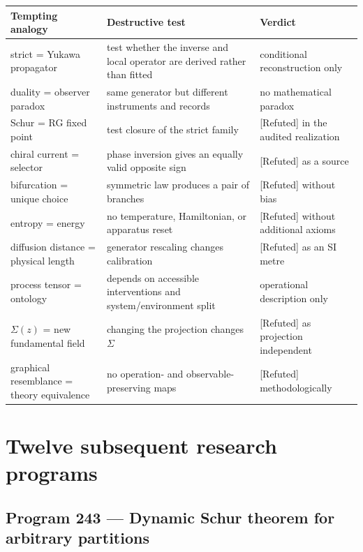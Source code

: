 \documentclass[11pt,a4paper,openany]{report}
\newcommand{\statusRefuted}{\textcolor{finred}{[Refuted]}}
\begin{document}
\begin{center}
\begingroup\small
\setlength{\tabcolsep}{2.5pt}
\renewcommand{\arraystretch}{1.16}
\begin{longtable}{@{}p{}p{}p{}@{}}
\toprule
\textbf{Tempting analogy} & \textbf{Destructive test} & \textbf{Verdict} \\
\midrule
\endhead
strict = Yukawa propagator & test whether the inverse and local operator are derived rather than fitted & conditional reconstruction only \\
duality = observer paradox & same generator but different instruments and records & no mathematical paradox \\
Schur = RG fixed point & test closure of the strict family & \statusRefuted{} in the audited realization \\
chiral current = selector & phase inversion gives an equally valid opposite sign & \statusRefuted{} as a source \\
bifurcation = unique choice & symmetric law produces a pair of branches & \statusRefuted{} without bias \\
entropy = energy & no temperature, Hamiltonian, or apparatus reset & \statusRefuted{} without additional axioms \\
diffusion distance = physical length & generator rescaling changes calibration & \statusRefuted{} as an SI metre \\
process tensor = ontology & depends on accessible interventions and system/\allowbreak{}environment split & operational description only \\
\(\Sigma(z)\) = new fundamental field & changing the projection changes \(\Sigma\) & \statusRefuted{} as projection independent \\
graphical resemblance = theory equivalence & no operation- and observable-preserving maps & \statusRefuted{} methodologically \\
\bottomrule
\end{longtable}
\endgroup
\end{center}

\chapter{Twelve subsequent research programs}

\section{Program 243 --- Dynamic Schur theorem for arbitrary partitions}
\end{document}
